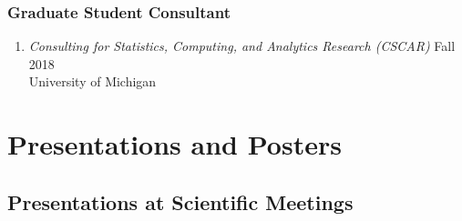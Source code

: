 \documentclass[letterpaper,11pt]{article} %
\begin{document}
	\subsubsection*{Graduate Student Consultant}
	\begin{enumerate}
		\item \textit{Consulting for Statistics, Computing, and Analytics Research (CSCAR)} \hfill Fall 2018 \\
		University of Michigan
	\end{enumerate}
	
	
	\section*{Presentations and Posters}
	
	\subsection*{Presentations at Scientific Meetings}
	
\end{document}
